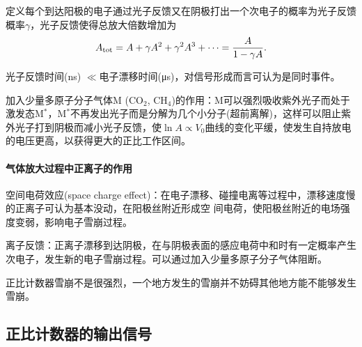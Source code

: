 定义每个到达阳极的电子通过光子反馈又在阴极打出一个次电子的概率为光子反馈概率$\gamma$，光子反馈使得总放大倍数增加为
\begin{equation}\label{eq:nrd-feedback-gain}
	A_{\mathrm{tot}} = A + \gamma A^2 + \gamma^2A^3 + \cdots = \frac A{1 - \gamma A}.
\end{equation}

\begin{compactitem}
	\item 光子反馈时间(\unit{ns}) $\ll$电子漂移时间(\unit{\micro\second})，对信号形成而言可认为是同时事件。
	\item 加入少量多原子分子气体M (CO$_2$, CH$_4$)的作用：M可以强烈吸收紫外光子而处于激发态M$^*$，M$^\ast$不再发出光子而是分解为几个小分子(超前离解)，这样可以阻止紫外光子打到阴极而减小光子反馈，使$\ln A \propto V_0$曲线的变化平缓，使发生自持放电的电压更高，以获得更大的正比工作区间。
\end{compactitem}
\paragraph{气体放大过程中正离子的作用}
空间电荷效应(space charge effect)：在电子漂移、碰撞电离等过程中，漂移速度慢的正离子可认为基本没动，在阳极丝附近形成空
间电荷，使阳极丝附近的电场强度变弱，影响电子雪崩过程。%

离子反馈：正离子漂移到达阴极，在与阴极表面的感应电荷中和时有一定概率产生次电子，发生新的电子雪崩过程。可以通过加入少量多原子分子气体阻断。

正比计数器雪崩不是很强烈，一个地方发生的雪崩并不妨碍其他地方能不能够发生雪崩。

\subsection{正比计数器的输出信号}

